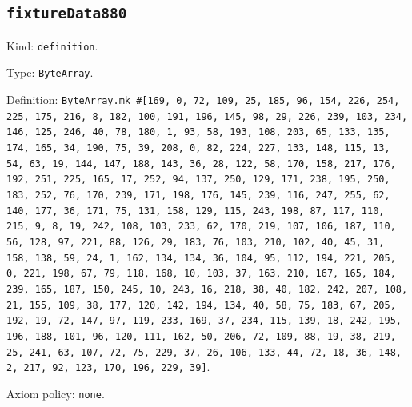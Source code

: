 \documentclass[11pt]{article}
\begin{document}
\subsection*{\texttt{fixtureData880}}
\noindent Kind: \texttt{definition}.\par
\noindent Type: \texttt{ByteArray}.\par
\noindent Definition: \texttt{ByteArray.mk \#[169, 0, 72, 109, 25, 185, 96, 154, 226, 254, 225, 175, 216, 8, 182, 100, 191, 196, 145, 98, 29, 226, 239, 103, 234, 146, 125, 246, 40, 78, 180, 1, 93, 58, 193, 108, 203, 65, 133, 135, 174, 165, 34, 190, 75, 39, 208, 0, 82, 224, 227, 133, 148, 115, 13, 54, 63, 19, 144, 147, 188, 143, 36, 28, 122, 58, 170, 158, 217, 176, 192, 251, 225, 165, 17, 252, 94, 137, 250, 129, 171, 238, 195, 250, 183, 252, 76, 170, 239, 171, 198, 176, 145, 239, 116, 247, 255, 62, 140, 177, 36, 171, 75, 131, 158, 129, 115, 243, 198, 87, 117, 110, 215, 9, 8, 19, 242, 108, 103, 233, 62, 170, 219, 107, 106, 187, 110, 56, 128, 97, 221, 88, 126, 29, 183, 76, 103, 210, 102, 40, 45, 31, 158, 138, 59, 24, 1, 162, 134, 134, 36, 104, 95, 112, 194, 221, 205, 0, 221, 198, 67, 79, 118, 168, 10, 103, 37, 163, 210, 167, 165, 184, 239, 165, 187, 150, 245, 10, 243, 16, 218, 38, 40, 182, 242, 207, 108, 21, 155, 109, 38, 177, 120, 142, 194, 134, 40, 58, 75, 183, 67, 205, 192, 19, 72, 147, 97, 119, 233, 169, 37, 234, 115, 139, 18, 242, 195, 196, 188, 101, 96, 120, 111, 162, 50, 206, 72, 109, 88, 19, 38, 219, 25, 241, 63, 107, 72, 75, 229, 37, 26, 106, 133, 44, 72, 18, 36, 148, 2, 217, 92, 123, 170, 196, 229, 39]}.\par
\noindent Axiom policy: \texttt{none}.\par
\end{document}
